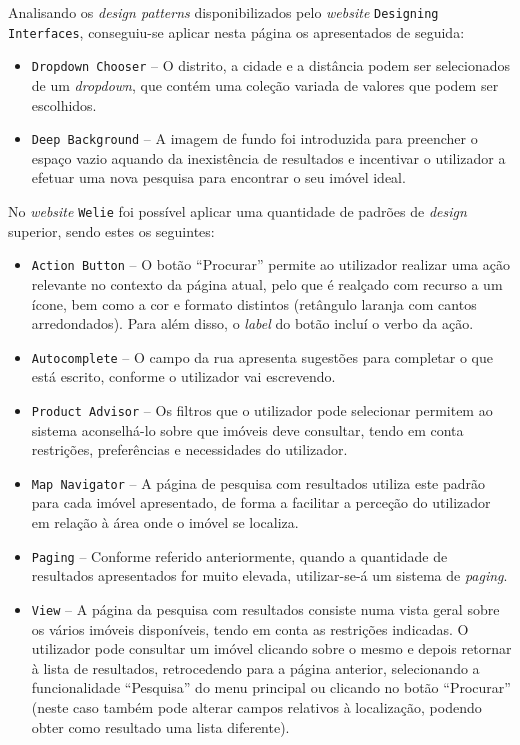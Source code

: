 Analisando os \textit{design patterns} disponibilizados pelo \textit{website} \texttt{Designing Interfaces}, conseguiu-se aplicar nesta página os apresentados de seguida:

\begin{itemize}
    \item \texttt{Dropdown Chooser} -- O distrito, a cidade e a distância podem ser selecionados de um \textit{dropdown}, que contém uma coleção variada de valores que podem ser escolhidos.
    
    \item \texttt{Deep Background} -- A imagem de fundo foi introduzida para preencher o espaço vazio aquando da inexistência de resultados e incentivar o utilizador a efetuar uma nova pesquisa para encontrar o seu imóvel ideal.
\end{itemize}

No \textit{website} \texttt{Welie} foi possível aplicar uma quantidade de padrões de \textit{design} superior, sendo estes os seguintes:

\begin{itemize}
    \item \texttt{Action Button} -- O botão ``Procurar'' permite ao utilizador realizar uma ação relevante no contexto da página atual, pelo que é realçado com recurso a um ícone, bem como a cor e formato distintos (retângulo laranja com cantos arredondados). Para além disso, o \textit{label} do botão incluí o verbo da ação.
    
    \item \texttt{Autocomplete} -- O campo da rua apresenta sugestões para completar o que está escrito, conforme o utilizador vai escrevendo.
    
    \item \texttt{Product Advisor} -- Os filtros que o utilizador pode selecionar permitem ao sistema aconselhá-lo sobre que imóveis deve consultar, tendo em conta restrições, preferências e necessidades do utilizador.
    
    \item \texttt{Map Navigator} -- A página de pesquisa com resultados utiliza este padrão para cada imóvel apresentado, de forma a facilitar a perceção do utilizador em relação à área onde o imóvel se localiza.
    
    \item \texttt{Paging} -- Conforme referido anteriormente, quando a quantidade de resultados apresentados for muito elevada, utilizar-se-á um sistema de \textit{paging}.
    
    \item \texttt{View} -- A página da pesquisa com resultados consiste numa vista geral sobre os vários imóveis disponíveis, tendo em conta as restrições indicadas. O utilizador pode consultar um imóvel clicando sobre o mesmo e depois retornar à lista de resultados, retrocedendo para a página anterior, selecionando a funcionalidade ``Pesquisa'' do menu principal ou clicando no botão ``Procurar'' (neste caso também pode alterar campos relativos à localização, podendo obter como resultado uma lista diferente).
\end{itemize}


